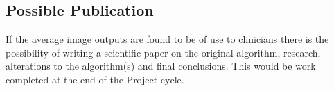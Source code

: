 \documentclass[11pt,fleqn,twoside]{article}
\begin{document}
\subsection{Possible Publication}
If the average image outputs are found to be of use to clinicians there is the possibility of writing a scientific paper on the original algorithm, research, alterations to the algorithm(s) and final conclusions. This would be work completed at the end of the Project cycle.

\nocite{*} %

\newpage
{}

%
%

\renewcommand{\refname}{Annotated Bibliography}  %
\end{document}
